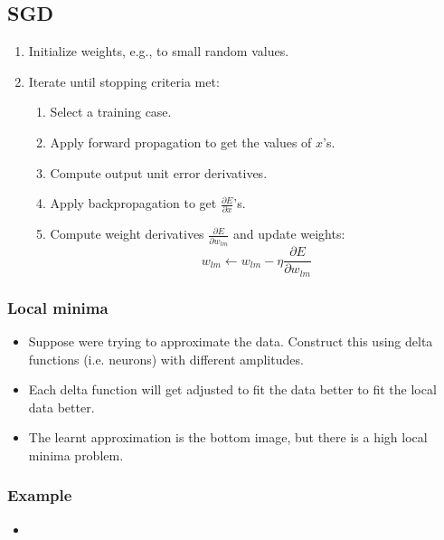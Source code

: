 \subsection{SGD}
\begin{definition}
    \begin{enumerate}
        \item Initialize weights, e.g., to small random values.
        \item Iterate until stopping criteria met:
        \begin{enumerate}
            \item Select a training case.
            \item Apply forward propagation to get the values of \( x \)'s.
            \item Compute output unit error derivatives.
            \item Apply backpropagation to get \( \frac{\partial E}{\partial x} \)'s.
            \item Compute weight derivatives \( \frac{\partial E}{\partial w_{lm}} \) and update weights:
            \[
            w_{lm} \leftarrow w_{lm} - \eta \frac{\partial E}{\partial w_{lm}}
            \]
        \end{enumerate}
    \end{enumerate}
\end{definition}

\subsubsection{Local minima}
\begin{example}
    \begin{itemize}
        \item Suppose were trying to approximate the data. Construct this using delta functions (i.e. neurons) with different amplitudes. 
        \item Each delta function will get adjusted to fit the data better to fit the local data better. 
        \item The learnt approximation is the bottom image, but there is a high local minima problem. 
    \end{itemize}
\end{example}

\subsubsection{Example}
\begin{example}
    \begin{itemize}
        \item 
    \end{itemize}
\end{example}


